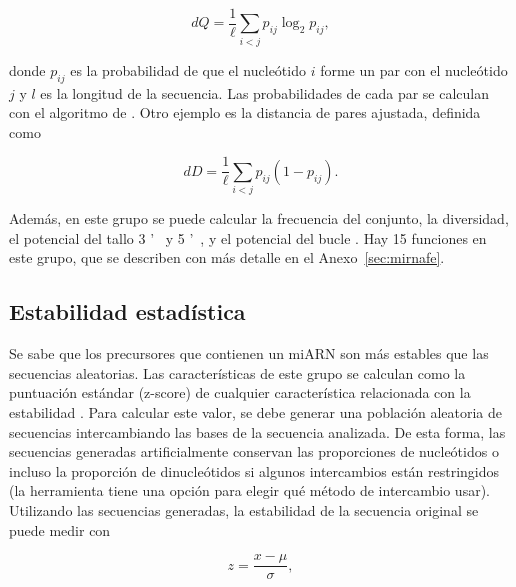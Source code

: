 \begin{equation}
	\label{eq:dQ}
	dQ = \frac{1}{\ell} \sum_{i<j} p_{ij} \log_2 p_{ij} ,
\end{equation}

\noindent donde $p_{ij}$ es la probabilidad de que el nucleótido $i$ forme un par con el nucleótido $j$ y $l$ es la longitud de la secuencia. Las
probabilidades de cada par se calculan con el algoritmo de \cite{mccaskill1990}. Otro ejemplo es la distancia de pares ajustada, definida como

\begin{equation}
	\label{eq:dD}
	dD = \frac{1}{\ell} \sum_{i<j} p_{ij} (1 - p_{ij}).
\end{equation}

Además, en este grupo se puede calcular la frecuencia del conjunto, la diversidad, el potencial del tallo 3 \textquoteright~ y 5 \textquoteright~, y el
potencial del bucle \citep{terai2007mirrim}. Hay 15 funciones en este grupo, que se describen con más detalle en el Anexo~\ref{sec:mirnafe}.

\subsection{Estabilidad estadística}

Se sabe que los precursores que contienen un miARN son más estables que las secuencias aleatorias. Las características de este grupo se calculan como la
puntuación estándar (z-score) de cualquier característica relacionada con la estabilidad \citep{bonnet2004evidence}. Para calcular este valor, se debe generar una
población aleatoria de secuencias intercambiando las bases de la secuencia analizada. De esta forma, las secuencias generadas artificialmente conservan las
proporciones de nucleótidos o incluso la proporción de dinucleótidos si algunos intercambios están restringidos (la herramienta tiene una opción para
elegir qué método de intercambio usar). Utilizando las secuencias generadas, la estabilidad de la secuencia original se puede medir con

\begin{equation}
	z = \frac{x-\mu}{\sigma},
\end{equation}

